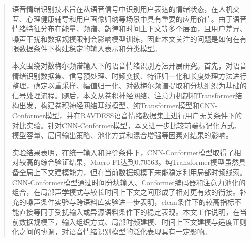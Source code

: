 %
%
%
%
%

\begin{abstract}
语音情绪识别技术旨在从语音信号中识别用户表达的情绪状态，在人机交互、心理健康辅导和用户画像归纳等场景中具有重要的应用价值。由于语音情绪特征分布在能量、频谱、韵律和时间上下文等多个层面，且用户差异、噪声干扰和数据规模限制会影响模型训练，因此本文关注的问题是如何在有限数据条件下构建稳定的输入表示和分类模型。

本文围绕对数梅尔频谱输入下的语音情绪识别方法开展研究。首先，对语音情绪识别数据集、信号预处理、时频变换、特征归一化和长度处理方法进行整理，确定以重采样、幅值归一化、对数梅尔频谱提取和分块组织为基础的信号处理流程。随后，本文从卷积神经网络、注意力机制和Transformer结构出发，构建卷积神经网络基线模型、纯Transformer模型和CNN-Conformer模型，并在RAVDESS语音情绪数据集上进行用户无关条件下的对比实验。针对CNN-Conformer模型，本文进一步比较前端标记化方式、模型容量、层间输出策略、池化方式和混合增强等因素对结果的影响。

实验结果表明，在统一输入和评价条件下，CNN-Conformer模型取得了相对较高的综合验证结果，Macro-F1达到0.70563。纯Transformer模型虽然具备全局上下文建模能力，但在当前数据规模下未能稳定利用局部时频线索。CNN-Conformer模型通过时间分块输入、Conformer编码器和注意力池化的组合，在局部声学模式与较长时间上下文之间形成了相对更有效的衔接。补充的噪声条件实验与跨语料库实验进一步表明，clean条件下的较高指标不能直接等同于受扰输入或异源语料条件下的稳定表现。本文工作说明，在当前数据规模下，输入组织方式、局部时频建模、时间上下文建模与适度正则化之间的协调，对语音情绪识别模型的泛化表现具有一定影响。

\end{abstract}


